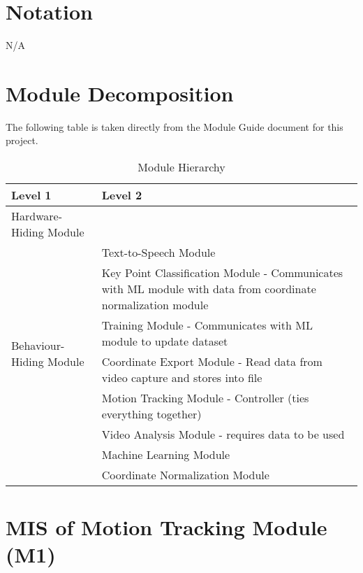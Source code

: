 \documentclass[12pt, titlepage]{article}
\begin{document}
\section{Notation}

N/A\\

\section{Module Decomposition}

The following table is taken directly from the Module Guide document for this project.

\begin{table}[h!]
\centering
\begin{tabular}{p{} p{}}
\toprule
\textbf{Level 1} & \textbf{Level 2}\\
\midrule

{Hardware-Hiding Module} &  \\
\midrule

\multirow{7}{0.3\textwidth}{Behaviour-Hiding Module} & Text-to-Speech Module\\
& Key Point Classification Module - Communicates with ML module with data from coordinate normalization module\\
& Training Module - Communicates with ML module to update dataset\\
& Coordinate Export Module - Read data from video capture and stores into file\\
& Motion Tracking Module - Controller (ties everything together)\\

\midrule

\multirow{3}{0.3\textwidth}{Software Decision Module} & Video Analysis Module - requires data to be used\\
& Machine Learning Module\\
& Coordinate Normalization Module\\
\bottomrule


\end{tabular}
\caption{Module Hierarchy}
\label{TblMH}
\end{table}


\newpage

\section{MIS of Motion Tracking Module (M1)} \label{m1}
\end{document}
